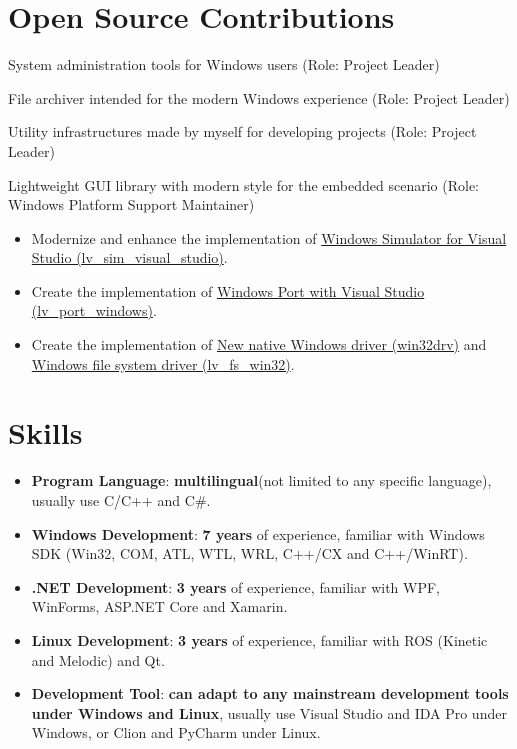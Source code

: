 \documentclass{resume}
\begin{document}
\section{Open Source Contributions}

System administration tools for Windows users (Role: Project Leader)

File archiver intended for the modern Windows experience (Role: Project Leader)

Utility infrastructures made by myself for developing projects (Role: Project Leader)

Lightweight GUI library with modern style for the embedded scenario (Role: Windows Platform Support Maintainer)
\begin{itemize}
  \item Modernize and enhance the implementation of \href{https://github.com/lvgl/lv_sim_visual_studio}{Windows Simulator for Visual Studio (lv\_sim\_visual\_studio)}.
  \item Create the implementation of \href{https://github.com/lvgl/lv_port_windows}{Windows Port with Visual Studio (lv\_port\_windows)}.
  \item Create the implementation of \href{https://github.com/lvgl/lv_drivers/pull/117}{New native Windows driver (win32drv)} and \href{https://github.com/lvgl/lvgl/pull/2701}{Windows file system driver (lv\_fs\_win32)}.
\end{itemize}

\section{Skills}
\begin{itemize}

  \item \textbf{Program Language}:
    \textbf{multilingual}(not limited to any specific language), usually use C/C++ and C\#.

  \item \textbf{Windows Development}:
    \textbf{7 years} of experience, familiar with Windows SDK (Win32, COM, ATL, WTL, WRL, C++/CX and C++/WinRT).

  \item \textbf{.NET Development}:
    \textbf{3 years} of experience, familiar with WPF, WinForms, ASP.NET Core and Xamarin.
  
  \item \textbf{Linux Development}:
    \textbf{3 years} of experience, familiar with ROS (Kinetic and Melodic) and Qt.

  \item \textbf{Development Tool}:
    \textbf{can adapt to any mainstream development tools under Windows and Linux}, usually use Visual Studio and IDA Pro under Windows, or Clion and PyCharm under Linux.

\end{itemize}
\end{document}
